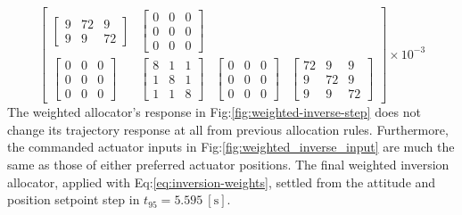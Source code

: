 \begin{equation}
\begin{bmatrix}
\begin{bmatrix}
9 & 72 & 9\\
9 & 9 & 72
\end{bmatrix}
&
\begin{bmatrix}
0 & 0 & 0\\
0 & 0 & 0\\
0 & 0 & 0
\end{bmatrix}
\\
\begin{bmatrix}
0 & 0 & 0\\
0 & 0 & 0\\
0 & 0 & 0
\end{bmatrix}
&
\begin{bmatrix}
8 & 1 & 1\\
1 & 8 & 1\\
1 & 1 & 8
\end{bmatrix}
&
\begin{bmatrix}
0 & 0 & 0\\
0 & 0 & 0\\
0 & 0 & 0
\end{bmatrix}
&
\begin{bmatrix}
72 & 9 & 9\\
9 & 72 & 9\\
9 & 9 & 72
\end{bmatrix}
\end{bmatrix}\times 10^{-3}
\end{equation}
\newpage
The weighted allocator's response in Fig:\ref{fig:weighted-inverse-step} does not change its trajectory response at all from previous allocation rules. Furthermore, the commanded actuator inputs in Fig:\ref{fig:weighted_inverse_input} are much the same as those of either preferred actuator positions. The final weighted inversion allocator, applied with Eq:\ref{eq:inversion-weights}, settled from the attitude and position setpoint step in $t_{95}=5.595~[\text{s}]$.
